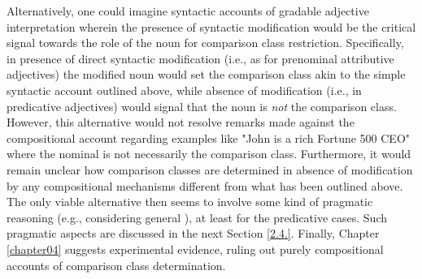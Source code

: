 Alternatively, one could imagine syntactic accounts of gradable adjective interpretation wherein the presence of syntactic modification would be the critical signal towards the role of the noun for comparison class restriction. Specifically, in presence of direct syntactic modification (i.e., as for prenominal attributive adjectives) the modified noun would set the comparison class akin to the simple syntactic account outlined above,  while absence of modification (i.e., in predicative adjectives) would signal that the noun is \emph{not} the comparison class. However, this alternative would not resolve remarks made against the compositional account regarding examples like "John is a rich Fortune 500 CEO" where the nominal is not necessarily the comparison class. Furthermore, it would remain unclear how comparison classes are determined in absence of modification by any compositional mechanisms different from what has been outlined above. The only viable alternative then seems to involve some kind of pragmatic reasoning (e.g., considering general \textcite[world knowledge][]{tessler2017warm}), at least for the predicative cases. Such pragmatic aspects are discussed in the next Section \ref{2.4.}. Finally, Chapter \ref{chapter04} suggests experimental evidence, ruling out purely compositional accounts of comparison class determination. 

